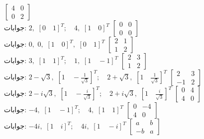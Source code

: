\quad 
$\begin{bmatrix}4&0\\0&2  \end{bmatrix}$\\
جوابات:
$2,\,\,[0 \quad1]^T; \quad  4,\,\, [1\quad 0]^T $
\quad 
$\begin{bmatrix}0&0\\0&0  \end{bmatrix}$\\
جوابات:
$0,\,\,0,\,\, [1 \quad 0]^T,\,\, [0\quad 1]^T $
\quad 
$\begin{bmatrix}2&1\\1&2  \end{bmatrix}$\\
جوابات:
$3,\,\,[1 \quad1]^T; \quad  1,\,\, [1\quad -1]^T $
\quad 
$\begin{bmatrix}2&3\\1&2  \end{bmatrix}$\\
جوابات:
$2-\sqrt{3},\,\,[1 \quad-\tfrac{1}{\sqrt{3}}]^T; \quad  2+\sqrt{3},\,\, [1\quad \tfrac{1}{\sqrt{3}}]^T $
\quad 
$\begin{bmatrix}2&3\\-1&2  \end{bmatrix}$\\
جوابات:
$2-i\sqrt{3},\,\,[1 \quad-\tfrac{i}{\sqrt{3}}]^T; \quad  2+i\sqrt{3},\,\, [1\quad \tfrac{i}{\sqrt{3}}]^T $
\quad 
$\begin{bmatrix}0&4\\4&0  \end{bmatrix}$\\
جوابات:
$-4,\,\,[1 \quad-1]^T; \quad  4,\,\, [1\quad 1]^T $
\quad 
$\begin{bmatrix}0&-4\\4&0  \end{bmatrix}$\\
جوابات:
$-4i,\,\,[1 \quad i]^T; \quad  4i,\,\, [1\quad -i]^T $
\quad 
$\begin{bmatrix} a&b\\-b&a  \end{bmatrix}$\\
